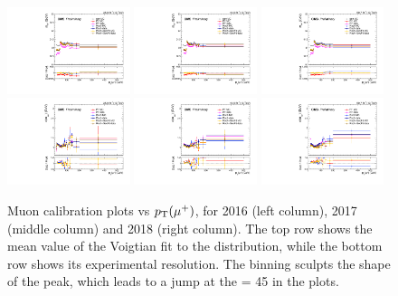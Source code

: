 \begin{figure}[!htb]
      \centering
      \includegraphics[width=0.32\textwidth]{pics/muon_corr/muon_cal/2016/muP_pt_summary_mean.pdf}
      \includegraphics[width=0.32\textwidth]{pics/muon_corr/muon_cal/2017/muP_pt_summary_mean.pdf}
      \includegraphics[width=0.32\textwidth]{pics/muon_corr/muon_cal/2018/muP_pt_summary_mean.pdf}
      \includegraphics[width=0.32\textwidth]{pics/muon_corr/muon_cal/2016/muP_pt_summary_reso.pdf}
      \includegraphics[width=0.32\textwidth]{pics/muon_corr/muon_cal/2017/muP_pt_summary_reso.pdf}
      \includegraphics[width=0.32\textwidth]{pics/muon_corr/muon_cal/2018/muP_pt_summary_reso.pdf}
      \caption{Muon calibration plots vs $p_{\mathrm{T}}(\mu^{+})$, for 2016 (left column), 2017 (middle column) and 2018 (right column).
               The top row shows the mean value of the Voigtian fit to the \mmm distribution, 
               while the bottom row shows its experimental resolution.
               The \pt binning sculpts the shape of the \mmm peak, which leads to a jump at the \pt = 45 \GeV in the plots.}
      \label{fig:mucal_muP_pt}
\end{figure}


